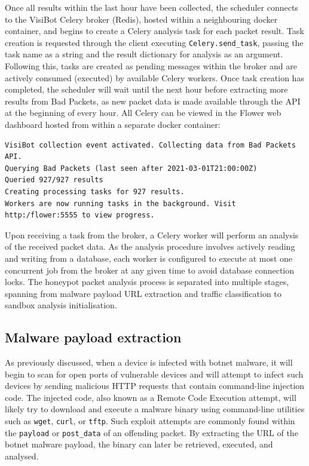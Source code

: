 Once all results within the last hour have been collected, the scheduler connects to the VisiBot Celery broker (Redis), hosted within a neighbouring docker container, and begins to create a Celery analysis task for each packet result. Task creation is requested through the client executing \texttt{Celery.send\_task}, passing the task name as a string and the result dictionary for analysis as an argument. Following this, tasks are created as pending messages within the broker and are actively consumed (executed) by available Celery workers. Once task creation has completed, the scheduler will wait until the next hour before extracting more results from Bad Packets, as new packet data is made available through the API at the beginning of every hour. All Celery can be viewed in the Flower web dashboard hosted from within a separate docker container:

\begin{lstlisting}[caption={Example output of VisiBot Processing Scheduler.}]
VisiBot collection event activated. Collecting data from Bad Packets API.
Querying Bad Packets (last seen after 2021-03-01T21:00:00Z)
Queried 927/927 results
Creating processing tasks for 927 results.
Workers are now running tasks in the background. Visit http:/flower:5555 to view progress.
\end{lstlisting}

Upon receiving a task from the broker, a Celery worker will perform an analysis of the received packet data. As the analysis procedure involves actively reading and writing from a database, each worker is configured to execute at most one concurrent job from the broker at any given time to avoid database connection locks. The honeypot packet analysis process is separated into multiple stages, spanning from malware payload URL extraction and traffic classification to sandbox analysis initialisation. 

\subsection{Malware payload extraction}

As previously discussed, when a device is infected with botnet malware, it will begin to scan for open ports of vulnerable devices and will attempt to infect such devices by sending malicious HTTP requests that contain command-line injection code. The injected code, also known as a Remote Code Execution attempt, will likely try to download and execute a malware binary using command-line utilities such as \texttt{wget}, \texttt{curl}, or \texttt{tftp}. Such exploit attempts are commonly found within the \texttt{payload} or \texttt{post\_data} of an offending packet. By extracting the URL of the botnet malware payload, the binary can later be retrieved, executed, and analysed. 

